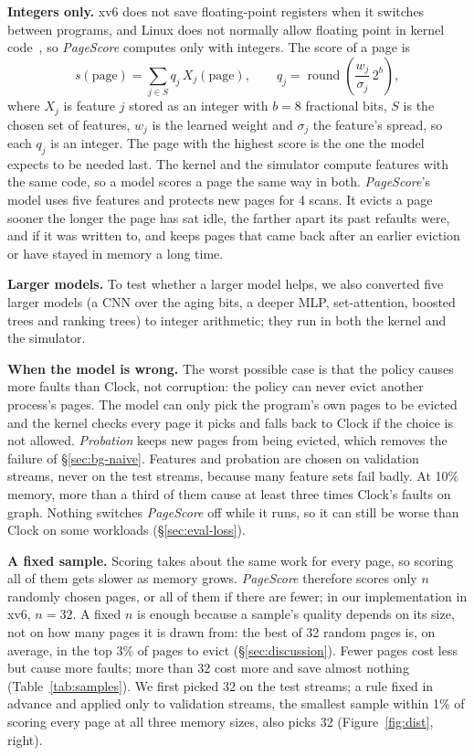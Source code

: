 \documentclass{article}
\newcommand{\clock}{Clock\xspace}
\DeclareRobustCommand{\pagescore}{\textit{PageScore}}
\newcommand{\finding}[1]{\textbf{#1}\hspace{0.4em}}
\begin{document}
\finding{Integers only.} xv6 does not save floating-point registers when it switches between programs, and Linux does not normally allow floating point in kernel code~\citep{linux_fpu}, so \pagescore{} computes only with integers. The score of a page is
\begin{equation}
s(\text{page}) = \sum_{j\in S} q_j\, X_j(\text{page}), \qquad
q_j = \operatorname{round}\!\left(\frac{w_j}{\sigma_j}\, 2^{b}\right),
\label{eq:score}
\end{equation}
where $X_j$ is feature $j$ stored as an integer with $b=8$ fractional bits, $S$ is the chosen set of features, $w_j$ is the learned weight and $\sigma_j$ the feature's spread, so each $q_j$ is an integer. The page with the highest score is the one the model expects to be needed last. The kernel and the simulator compute features with the same code, so a model scores a page the same way in both. \pagescore{}'s model uses five features and protects new pages for 4 scans. It evicts a page sooner the longer the page has sat idle, the farther apart its past refaults were, and if it was written to, and keeps pages that came back after an earlier eviction or have stayed in memory a long time.

\finding{Larger models.} To test whether a larger model helps, we also converted five larger models (a CNN over the aging bits, a deeper MLP, set-attention, boosted trees and ranking trees) to integer arithmetic; they run in both the kernel and the simulator.

\finding{When the model is wrong.} The worst possible case is that the policy causes more faults than \clock, not corruption: the policy can never evict another process's pages. The model can only pick the program's own pages to be evicted and the kernel checks every page it picks and falls back to \clock if the choice is not allowed. \emph{Probation} keeps new pages from being evicted, which removes the failure of \S\ref{sec:bg-naive}. Features and probation are chosen on validation streams, never on the test streams, because many feature sets fail badly. At 10\% memory, more than a third of them cause at least three times \clock's faults on graph. Nothing switches \pagescore{} off while it runs, so it can still be worse than \clock on some workloads (\S\ref{sec:eval-loss}).

\finding{A fixed sample.} Scoring takes about the same work for every page, so scoring all of them gets slower as memory grows. \pagescore{} therefore scores only $n$ randomly chosen pages, or all of them if there are fewer; in our implementation in xv6, $n=32$. A fixed $n$ is enough because a sample's quality depends on its size, not on how many pages it is drawn from: the best of 32 random pages is, on average, in the top 3\% of pages to evict (\S\ref{sec:discussion}). Fewer pages cost less but cause more faults; more than 32 cost more and save almost nothing (Table~\ref{tab:samples}). We first picked 32 on the test streams; a rule fixed in advance and applied only to validation streams, the smallest sample within 1\% of scoring every page at all three memory sizes, also picks 32 (Figure~\ref{fig:dist}, right).
\end{document}
